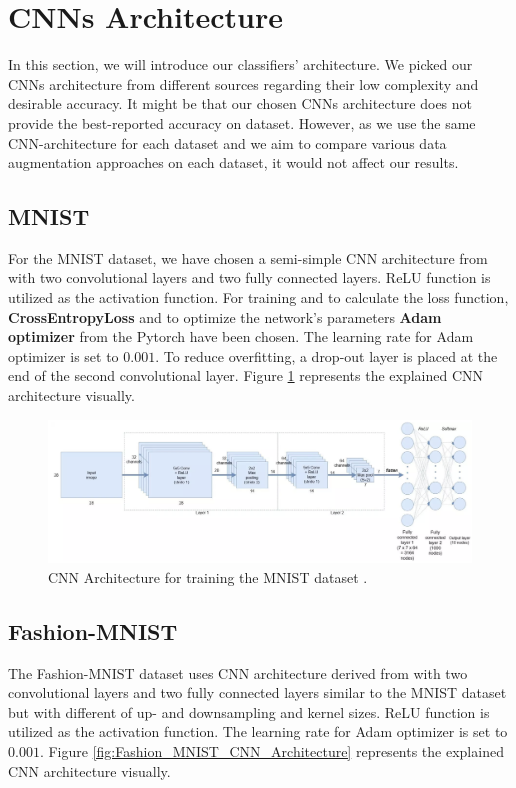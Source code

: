 \section{CNNs Architecture}
In this section, we will introduce our classifiers' architecture. We picked our CNNs architecture from
different sources regarding their low complexity and desirable accuracy.  It might be that our chosen
CNNs architecture does not provide the best-reported accuracy on dataset. However, as we use the
same CNN-architecture for each dataset and we aim to compare various data augmentation approaches on
each dataset, it would not affect our results.

\subsection{MNIST}
For the MNIST dataset, we have chosen a semi-simple CNN architecture from
\cite{MNIST_CNN_Architecture} with two
convolutional layers and two fully connected layers. ReLU function is utilized as the activation
function. For training and to calculate the loss function, \textbf{CrossEntropyLoss} and
to optimize the network's parameters \textbf{Adam optimizer} \cite{adam_optimizer} from the Pytorch have been
chosen. The learning rate for Adam optimizer is set to $0.001$. To reduce overfitting, a
drop-out layer is placed at the end of the second convolutional layer. Figure \ref{fig:MNIST_CNN_Architecture} represents the explained CNN architecture visually.

\begin{figure}
  \centering
  \label{fig:MNIST_CNN_Architecture}
  \includegraphics[width=1\textwidth]{fig/MNIST-CNN-Architecture}
  \caption{CNN Architecture for training the MNIST dataset \cite{MNIST_CNN_Architecture_Image}.}
\end{figure}


\subsection{Fashion-MNIST}
The Fashion-MNIST dataset uses CNN architecture derived from \cite{FashionMNIST_dataset_example} with two
convolutional layers and two fully connected layers similar to the MNIST dataset but with
different of up- and downsampling and kernel sizes. ReLU function is utilized as the activation
function. The learning rate for Adam optimizer is set to $0.001$. Figure \ref{fig:Fashion_MNIST_CNN_Architecture} represents the explained CNN architecture visually.

